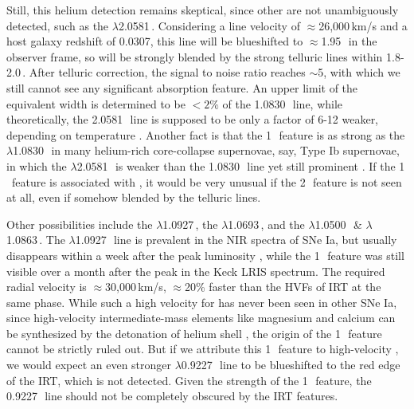 \documentclass[twocolumn]{aastex631}
\begin{document}
Still, this helium detection remains skeptical, since other  are not unambiguously detected, such as the  $\lambda$2.0581\,\micron. Considering a line velocity of $\approx$26,000\,km/s and a host galaxy redshift of 0.0307, this line will be blueshifted to $\approx$1.95\,\micron\ in the observer frame, so will be strongly blended by the strong telluric lines within 1.8-2.0\,\micron. After telluric correction, the signal to noise ratio reaches $\sim$5, with which we still cannot see any significant absorption feature. An upper limit of the equivalent width is determined to be $<2\%$ of the 1.0830\,\micron\ line, while theoretically, the 2.0581\,\micron\ line is supposed to be only a factor of 6-12 weaker, depending on temperature \citep{Marion2009_NIR}. Another fact is that the 1\,\micron\ feature is as strong as the  $\lambda$1.0830\,\micron\ in many helium-rich core-collapse supernovae, say, Type Ib supernovae, in which the  $\lambda$2.0581\,\micron\ is weaker than the 1.0830\,\micron\ line yet still prominent \citep{CSP_Ibc_2022}. If the 1\,\micron\ feature is associated with , it would be very unusual if the 2\,\micron\ feature is not seen at all, even if somehow blended by the telluric lines.

Other possibilities include the  $\lambda$1.0927\,\micron, the  $\lambda$1.0693\,\micron, and the  $\lambda$1.0500\,\micron\ \& $\lambda$1.0863\,\micron. The  $\lambda$1.0927\,\micron\ line is prevalent in the NIR spectra of SNe Ia, but usually disappears within a week after the peak luminosity \citep{Marion2009_NIR}, while the 1\,\micron\ feature was still visible over a month after the peak in the Keck LRIS spectrum. The required radial velocity is $\approx$30,000\,km/s, $\approx$20\% faster than the HVFs of  IRT at the same phase. While such a high velocity for  has never been seen in other SNe Ia, since high-velocity intermediate-mass elements like magnesium and calcium can be synthesized by the detonation of helium shell \citep{Shen_DD_2014}, the  origin of the 1\,\micron\ feature cannot be strictly ruled out. But if we attribute this 1\,\micron\ feature to high-velocity , we would expect an even stronger $\lambda$0.9227\,\micron\ line to be blueshifted to the red edge of the  IRT, which is not detected. Given the strength of the 1\,\micron\ feature, the 0.9227\,\micron\ line should not be completely obscured by the  IRT features. 
\end{document}
